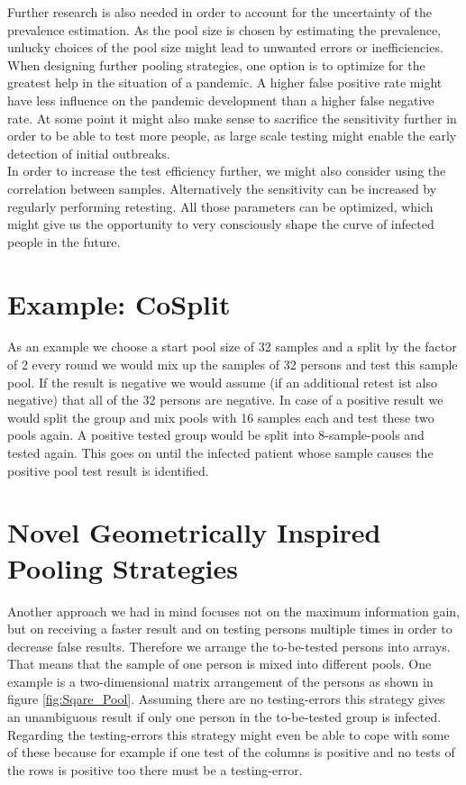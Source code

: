 \documentclass[fleqn,10pt]{wlscirep}
\begin{document}
	Further research is also needed in order to account for the uncertainty of the prevalence estimation. As the pool size is chosen by estimating the prevalence, unlucky choices of the pool size might lead to unwanted errors or inefficiencies. When designing further pooling strategies, one option is to optimize for the greatest help in the situation of a pandemic. A higher false positive rate might have less influence on the pandemic development than a higher false negative rate. At some point it might also make sense to sacrifice the sensitivity further in order to be able to test more people, as large scale testing might enable the early detection of initial outbreaks.\\
	
	In order to increase the test efficiency further, we might also consider using the correlation between samples. Alternatively the sensitivity can be increased by regularly performing retesting. All those parameters can be optimized, which might give us the opportunity to very consciously shape the curve of infected people in the future.
	
	\glsaddall
	\printglossary
	
	
	\printbibliography
	
	\appendix
	\section{Example: CoSplit}
	\label{append:example_CoSplit}
	As an example we choose a start pool size of 32 samples and a split by the factor of 2 every round we would mix up the samples of 32 persons and test this sample pool. If the result is negative we would assume (if an additional retest ist also negative) that all of the 32 persons are negative. In case of a positive result we would split the group and mix pools with 16 samples each and test these two pools again. A positive tested group would be split into 8-sample-pools and tested again. This goes on until the infected patient whose sample causes the positive pool test result is identified. 
	
	\section{Novel Geometrically Inspired Pooling Strategies}
	\label{append:explain_square_cube_test}
	Another approach we had in mind focuses not on the maximum information gain, but on receiving a faster result and on testing persons multiple times in order to decrease false results. Therefore we arrange the to-be-tested persons into arrays. That means that the sample of one person is mixed into different pools. 
	One example is a two-dimensional matrix arrangement of the persons as shown in figure \ref{fig:Sqare_Pool}. Assuming there are no testing-errors this strategy gives an unambiguous result if only one person in the to-be-tested group is infected. Regarding the testing-errors this strategy might even be able to cope with some of these because for example if one test of the columns is positive and no tests of the rows is positive too there must be a testing-error. 
	
\end{document}
